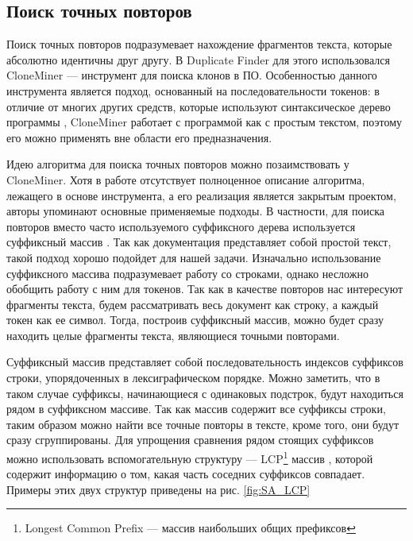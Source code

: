 \documentclass[14pt]{matmex-diploma-custom}
\begin{document}
\subsection{Поиск точных повторов}

Поиск точных повторов подразумевает нахождение фрагментов текста, которые абсолютно идентичны друг другу. В Duplicate Finder для этого использовался CloneMiner \cite{bib:tool:CloneMiner} --- инструмент для поиска клонов в ПО. Особенностью данного инструмента является подход, основанный на последовательности токенов: в отличие от многих других средств, которые используют синтаксическое дерево программы \cite{bib:tool:ASTSearch}, CloneMiner работает с программой как с простым текстом, поэтому его можно применять вне области его предназначения.

Идею алгоритма для поиска точных повторов можно позаимствовать у CloneMiner. Хотя в работе \cite{bib:tool:CloneMiner} отсутствует полноценное описание алгоритма, лежащего в основе инструмента, а его реализация является закрытым проектом, авторы упоминают основные применяемые подходы. В частности, для поиска повторов вместо часто используемого суффиксного дерева \cite{bib:art:SuffixTree} используется суффиксный массив \cite{bib:art:SuffixArray}. Так как документация представляет собой простой текст, такой подход хорошо подойдет для нашей задачи. Изначально использование суффиксного массива подразумевает работу со строками, однако несложно обобщить работу с ним для токенов. Так как в качестве повторов нас интересуют фрагменты текста, будем рассматривать весь документ как строку, а каждый токен как ее символ. Тогда, построив суффиксный массив, можно будет сразу находить целые фрагменты текста, являющиеся точными повторами.

Суффиксный массив представляет собой последовательность индексов суффиксов строки, упорядоченных в лексиграфическом порядке. Можно заметить, что в таком случае суффиксы, начинающиеся с одинаковых подстрок, будут находиться рядом в суффиксном массиве. Так как массив содержит все суффиксы строки, таким образом можно найти все точные повторы в тексте, кроме того, они будут сразу сгруппированы. Для упрощения сравнения рядом стоящих суффиксов можно использовать вспомогательную структуру --- LCP\footnote{Longest Common Prefix --- массив наибольших общих префиксов} массив \cite{bib:art:LCPArray}, которой содержит информацию о том, какая часть соседних суффиксов совпадает. Примеры этих двух структур приведены на рис. \ref{fig:SA_LCP}
\end{document}

